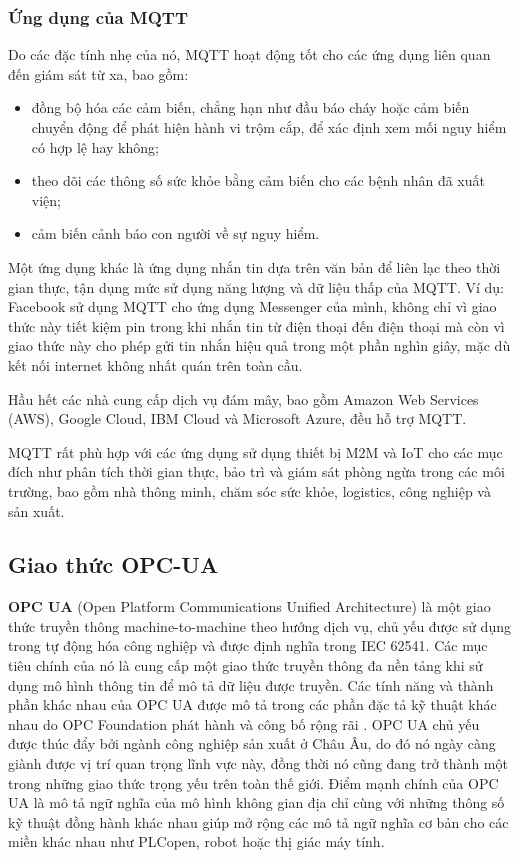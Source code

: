 \subsubsection{Ứng dụng của MQTT}
Do các đặc tính nhẹ của nó, MQTT hoạt động tốt cho các ứng dụng liên quan đến giám sát từ xa, bao gồm:
\begin{itemize}
    \item đồng bộ hóa các cảm biến, chẳng hạn như đầu báo cháy hoặc cảm biến chuyển động để phát hiện hành vi trộm cắp, để xác định xem mối nguy hiểm có hợp lệ hay không;
   \item theo dõi các thông số sức khỏe bằng cảm biến cho các bệnh nhân đã xuất viện;
   \item cảm biến cảnh báo con người về sự nguy hiểm.
\end{itemize}


Một ứng dụng khác là ứng dụng nhắn tin dựa trên văn bản để liên lạc theo thời gian thực, tận dụng mức sử dụng năng lượng và dữ liệu thấp của MQTT. Ví dụ: Facebook sử dụng MQTT cho ứng dụng Messenger của mình, không chỉ vì giao thức này tiết kiệm pin trong khi nhắn tin từ điện thoại đến điện thoại mà còn vì giao thức này cho phép gửi tin nhắn hiệu quả trong một phần nghìn giây, mặc dù kết nối internet không nhất quán trên toàn cầu.

Hầu hết các nhà cung cấp dịch vụ đám mây, bao gồm Amazon Web Services (AWS), Google Cloud, IBM Cloud và Microsoft Azure, đều hỗ trợ MQTT.

MQTT rất phù hợp với các ứng dụng sử dụng thiết bị M2M và IoT cho các mục đích như phân tích thời gian thực, bảo trì và giám sát phòng ngừa trong các môi trường, bao gồm nhà thông minh, chăm sóc sức khỏe, logistics, công nghiệp và sản xuất.

\subsection{Giao thức OPC-UA}

\textbf{OPC UA} (Open Platform Communications Unified Architecture) là một giao thức truyền thông machine-to-machine theo hướng dịch vụ, chủ yếu được sử dụng trong tự động hóa công nghiệp và được định nghĩa trong IEC 62541. Các mục tiêu chính của nó là cung cấp một giao thức truyền thông đa nền tảng khi sử dụng mô hình thông tin để mô tả dữ liệu được truyền. Các tính năng và thành phần khác nhau của OPC UA được mô tả trong các phần đặc tả kỹ thuật khác nhau do OPC Foundation phát hành và công bố rộng rãi . OPC UA chủ yếu được thúc đẩy bởi ngành công nghiệp sản xuất ở Châu Âu, do đó nó ngày càng giành được vị trí quan trọng lĩnh vực này, đồng thời nó cũng đang trở thành một trong những giao thức trọng yếu trên toàn thế giới. Điểm mạnh chính của OPC UA là mô tả ngữ nghĩa của mô hình không gian địa chỉ cùng với những thông số kỹ thuật đồng hành khác nhau giúp mở rộng các mô tả ngữ nghĩa cơ bản cho các miền khác nhau như PLCopen, robot hoặc thị giác máy tính.
   
